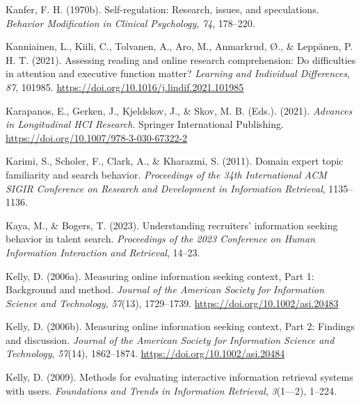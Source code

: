 \documentclass[letterpaper, nobind]{templates/ociamthesis}
\newlength{\cslhangindent}
\newenvironment{CSLReferences}[2] %
 {%
  \setlength{\parindent}{0pt}
  \ifodd #1
  \let\oldpar\par
  \def\par{\hangindent=\cslhangindent\oldpar}
  \fi
  \setlength{\parskip}{1mm}
  \setlength{\baselineskip}{6mm}
 }%
 {}
\begin{document}
\begin{CSLReferences}{1}{0}
\leavevmode{}%
Kanfer, F. H. (1970b). Self-regulation: Research, issues, and speculations. \emph{Behavior Modification in Clinical Psychology}, \emph{74}, 178--220.

\leavevmode{}%
Kanniainen, L., Kiili, C., Tolvanen, A., Aro, M., Anmarkrud, Ø., \& Leppänen, P. H. T. (2021). Assessing reading and online research comprehension: Do difficulties in attention and executive function matter? \emph{Learning and Individual Differences}, \emph{87}, 101985. \url{https://doi.org/10.1016/j.lindif.2021.101985}

\leavevmode{}%
Karapanos, E., Gerken, J., Kjeldskov, J., \& Skov, M. B. (Eds.). (2021). \emph{Advances in {Longitudinal HCI Research}}. {Springer International Publishing}. \url{https://doi.org/10.1007/978-3-030-67322-2}

\leavevmode{}%
Karimi, S., Scholer, F., Clark, A., \& Kharazmi, S. (2011). Domain expert topic familiarity and search behavior. \emph{Proceedings of the 34th International ACM SIGIR Conference on Research and Development in Information Retrieval}, 1135--1136.

\leavevmode{}%
Kaya, M., \& Bogers, T. (2023). Understanding recruiters' information seeking behavior in talent search. \emph{Proceedings of the 2023 Conference on Human Information Interaction and Retrieval}, 14--23.

\leavevmode{}%
Kelly, D. (2006a). Measuring online information seeking context, {Part} 1: Background and method. \emph{Journal of the American Society for Information Science and Technology}, \emph{57}(13), 1729--1739. \url{https://doi.org/10.1002/asi.20483}

\leavevmode{}%
Kelly, D. (2006b). Measuring online information seeking context, {Part} 2: Findings and discussion. \emph{Journal of the American Society for Information Science and Technology}, \emph{57}(14), 1862--1874. \url{https://doi.org/10.1002/asi.20484}

\leavevmode{}%
Kelly, D. (2009). Methods for evaluating interactive information retrieval systems with users. \emph{Foundations and Trends in Information Retrieval}, \emph{3}(1---2), 1--224.


\end{CSLReferences}
\end{document}
